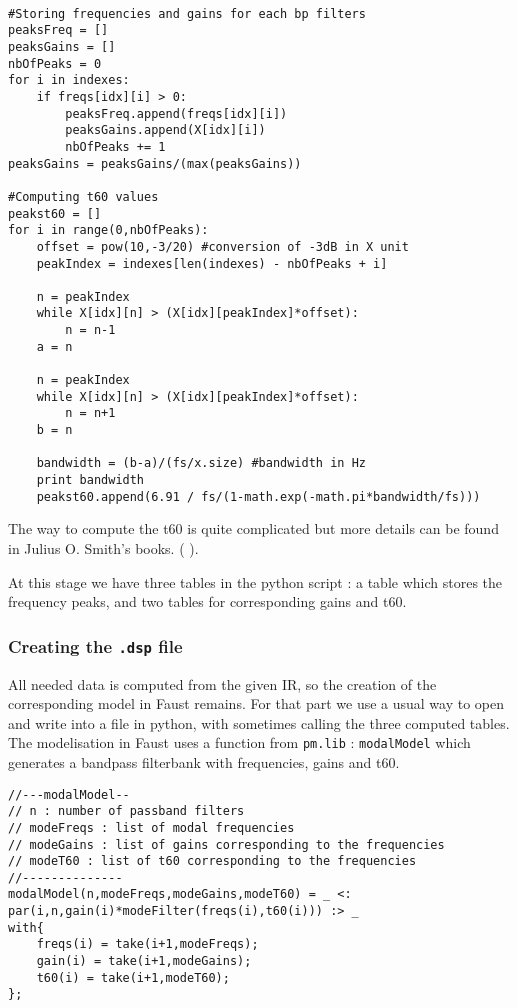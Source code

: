 \begin{lstlisting}

#Storing frequencies and gains for each bp filters
peaksFreq = []
peaksGains = []
nbOfPeaks = 0
for i in indexes:
    if freqs[idx][i] > 0:
        peaksFreq.append(freqs[idx][i])
        peaksGains.append(X[idx][i])
        nbOfPeaks += 1
peaksGains = peaksGains/(max(peaksGains))

#Computing t60 values
peakst60 = []
for i in range(0,nbOfPeaks):
    offset = pow(10,-3/20) #conversion of -3dB in X unit
    peakIndex = indexes[len(indexes) - nbOfPeaks + i]

    n = peakIndex
    while X[idx][n] > (X[idx][peakIndex]*offset):
        n = n-1
    a = n

    n = peakIndex
    while X[idx][n] > (X[idx][peakIndex]*offset):
        n = n+1
    b = n
    
    bandwidth = (b-a)/(fs/x.size) #bandwidth in Hz
    print bandwidth
    peakst60.append(6.91 / fs/(1-math.exp(-math.pi*bandwidth/fs)))
\end{lstlisting}

The way to compute the t60 is quite complicated but more details can be found in Julius O. Smith's books. (\cite{digitalfilters} \cite{dftmaths}).

At this stage we have three tables in the python script : a table which stores the frequency peaks, and two tables for corresponding gains and t60.

\subsubsection*{Creating the \texttt{.dsp} file}
All needed data is computed from the given IR, so the creation of the corresponding model in Faust remains. For that part we use a usual way to open and write into a file in python, with sometimes calling the three computed tables. The modelisation in Faust uses a function from \texttt{pm.lib} : \texttt{modalModel} which generates a bandpass filterbank with frequencies, gains and t60.

\begin{lstlisting}
//---modalModel--
// n : number of passband filters
// modeFreqs : list of modal frequencies
// modeGains : list of gains corresponding to the frequencies
// modeT60 : list of t60 corresponding to the frequencies
//--------------
modalModel(n,modeFreqs,modeGains,modeT60) = _ <: par(i,n,gain(i)*modeFilter(freqs(i),t60(i))) :> _
with{
	freqs(i) = take(i+1,modeFreqs);
	gain(i) = take(i+1,modeGains);
	t60(i) = take(i+1,modeT60);
};
\end{lstlisting}

